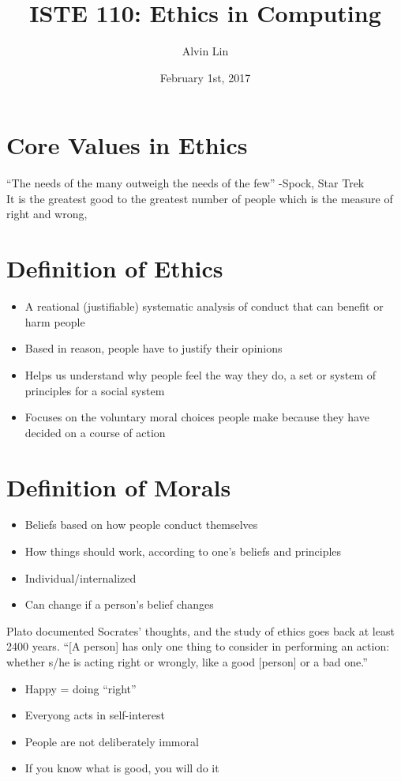 \documentclass[letterpaper, 12pt]{article}
\title{ISTE 110: Ethics in Computing}
\author{Alvin Lin}
\date{February 1st, 2017}
\begin{document}
\maketitle

\section*{Core Values in Ethics}
``The needs of the many outweigh the needs of the few'' -Spock, Star Trek \\
It is the greatest good to the greatest number of people which is the measure of right and wrong,

\section*{Definition of Ethics}
\begin{itemize}
  \item A reational (justifiable) systematic analysis of conduct that can
    benefit or harm people
  \item Based in reason, people have to justify their opinions
  \item Helps us understand why people feel the way they do, a set or system of
    principles for a social system
  \item Focuses on the voluntary moral choices people make because they have
    decided on a course of action
\end{itemize}

\section*{Definition of Morals}
\begin{itemize}
  \item Beliefs based on how people conduct themselves
  \item How things should work, according to one's beliefs and principles
  \item Individual/internalized
  \item Can change if a person's belief changes
\end{itemize}
Plato documented Socrates' thoughts, and the study of ethics goes back at least 2400 years.
``[A person] has only one thing to consider in performing an action: whether
s/he is acting right or wrongly, like a good [person] or a bad one.''
\begin{itemize}
  \item Happy = doing ``right''
  \item Everyong acts in self-interest
  \item People are not deliberately immoral
  \item If you know what is good, you will do it
\end{itemize}
\end{document}
